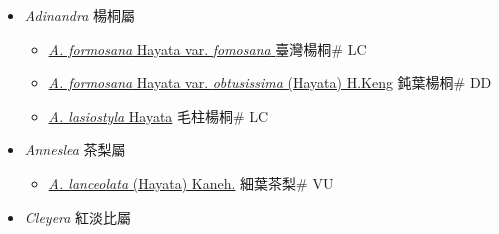 
  \begin{itemize}
 \item[] \textit{Adinandra} 楊桐屬
                    
  \begin{itemize}
        \item[] \href{http://www.theplantlist.org/tpl1.1/search?q=Adinandra+formosana+var.+fomosana}{\textit{A. formosana} Hayata var. \textit{fomosana} }   臺灣楊桐\# LC
        \item[] \href{http://www.theplantlist.org/tpl1.1/search?q=Adinandra+formosana+var.+obtusissima}{\textit{A. formosana} Hayata var. \textit{obtusissima} (Hayata) H.Keng}   鈍葉楊桐\# DD
        \item[] \href{http://www.theplantlist.org/tpl1.1/search?q=Adinandra+lasiostyla}{\textit{A. lasiostyla} Hayata}   毛柱楊桐\# LC
  \end{itemize}
 \item[] \textit{Anneslea} 茶梨屬
                    
  \begin{itemize}
        \item[] \href{http://www.theplantlist.org/tpl1.1/search?q=Anneslea+lanceolata}{\textit{A. lanceolata} (Hayata) Kaneh.}   細葉茶梨\# VU
  \end{itemize}
 \item[] \textit{Cleyera} 紅淡比屬
                    

\end{itemize}

